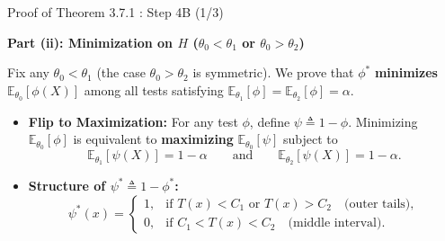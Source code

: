 \documentclass[10pt, aspectratio=169, xcolor=dvipsnames]{beamer}
\newcommand{\lead}[1]{{\color{UniBlue}\bfseries #1}}
\begin{document}
\begin{frame}{Proof of Theorem 3.7.1 : Step 4B (1/3)}
    
    \lead{Part (ii): Minimization on $H$ ($\theta_0 < \theta_1$ or $\theta_0 > \theta_2$)}\\
    \vspace{0.2cm}
    
    \color{Slate}
    Fix any $\theta_0 < \theta_1$ (the case $\theta_0 > \theta_2$ is symmetric). We prove that $\phi^*$ \textbf{minimizes} $\mathbb{E}_{\theta_0}[\phi(X)]$ among all tests satisfying $\mathbb{E}_{\theta_1}[\phi] = \mathbb{E}_{\theta_2}[\phi] = \alpha$.
    
    \vspace{0.15cm}
    \begin{itemize}
        \setlength\itemsep{6pt}
        \item[\textcolor{Teal}{\textbullet}] \textbf{Flip to Maximization:} For any test $\phi$, define $\psi \triangleq 1 - \phi$. Minimizing $\mathbb{E}_{\theta_0}[\phi]$ is equivalent to \textbf{maximizing} $\mathbb{E}_{\theta_0}[\psi]$ subject to
        \[
            \mathbb{E}_{\theta_1}[\psi(X)] = 1 - \alpha
            \qquad \text{and} \qquad
            \mathbb{E}_{\theta_2}[\psi(X)] = 1 - \alpha.
        \]
        
        \item[\textcolor{Teal}{\textbullet}] \textbf{Structure of $\psi^* \triangleq 1 - \phi^*$:}
        \[
            \psi^*(x) = \begin{cases}
                1, & \text{if } T(x) < C_1 \text{ or } T(x) > C_2 \quad \text{(outer tails)}, \\
                0, & \text{if } C_1 < T(x) < C_2 \quad \text{(middle interval)}.
            \end{cases}
        \]
    \end{itemize}
\end{frame}
\end{document}
